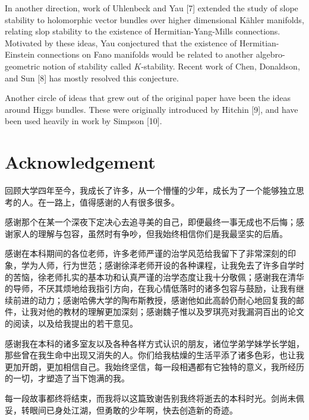 \documentclass[11pt]{amsart}
\numberwithin{equation}{section}
\theoremstyle{plain}
\theoremstyle{plain}
\numberwithin{equation}{section}
\begin{document}
In another direction, work of Uhlenbeck and Yau [7] extended the study of slope stability to holomorphic vector bundles over higher dimensional Kähler manifolds, relating slop stability to the existence of Hermitian-Yang-Mills connections. Motivated by these ideas, Yau conjectured that the existence of Hermitian-Einstein connections on Fano manifolds would be related to another algebro-geometric notion of stability called $K$-stability. Recent work of Chen, Donaldson, and Sun [8] has mostly resolved this conjecture.

Another circle of ideas that grew out of the original paper have been the ideas around Higgs bundles. These were originally introduced by Hitchin [9], and have been used heavily in work by Simpson [10].

\section{Acknowledgement}
\begin{CJK}{UTF8}{gkai}
回顾大学四年至今，我成长了许多，从一个懵懂的少年，成长为了一个能够独立思考的人。在一路上，值得感谢的人有很多很多。

感谢那个在某一个深夜下定决心去追寻美的自己，即便最终一事无成也不后悔；感谢家人的理解与包容，虽然时有争吵，但我始终相信你们是我最坚实的后盾。

感谢在本科期间的各位老师，许多老师严谨的治学风范给我留下了非常深刻的印象，学为人师，行为世范；感谢徐泽老师开设的各种课程，让我免去了许多自学时的苦恼，徐老师扎实的基本功和认真严谨的治学态度让我十分敬佩；感谢我在清华的导师，不厌其烦地给我指引方向，在我心情低落时的诸多包容与鼓励，让我有继续前进的动力；感谢哈佛大学的陶布斯教授，感谢他如此高龄仍耐心地回复我的邮件，让我对他的教材的理解更加深刻；感谢魏子惟以及罗琪亮对我漏洞百出的论文的阅读，以及给我提出的若干意见。

感谢我在本科的诸多室友以及各种各样方式认识的朋友，诸位学弟学妹学长学姐，那些曾在我生命中出现又消失的人。你们给我枯燥的生活平添了诸多色彩，也让我更加开朗，更加相信自己。我始终坚信，每一段相遇都有它独特的意义，我所经历的一切，才塑造了当下饱满的我。

每一段故事都终将结束，而我将以这篇致谢告别我终将逝去的本科时光。剑尚未佩妥，转眼间已身处江湖，但勇敢的少年啊，快去创造新的奇迹。


\end{CJK}
\end{document}
